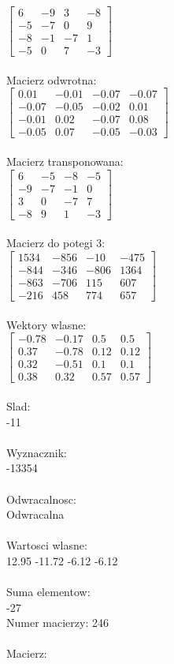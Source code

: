 \documentclass[a4paper,12pt]{article}
\begin{document}
$\begin{bmatrix} 6&-9&3&-8\\-5&-7&0&9\\-8&-1&-7&1\\-5&0&7&-3 \end{bmatrix}$
\\
\\
Macierz odwrotna:\\

$\begin{bmatrix} 0.01&-0.01&-0.07&-0.07\\-0.07&-0.05&-0.02&0.01\\-0.01&0.02&-0.07&0.08\\-0.05&0.07&-0.05&-0.03 \end{bmatrix}$
\\
\\
Macierz transponowana:\\

$\begin{bmatrix} 6&-5&-8&-5\\-9&-7&-1&0\\3&0&-7&7\\-8&9&1&-3 \end{bmatrix}$
\\
\\
Macierz do potegi 3:\\

$\begin{bmatrix} 1534&-856&-10&-475\\-844&-346&-806&1364\\-863&-706&115&607\\-216&458&774&657 \end{bmatrix}$
\\
\\
Wektory wlasne:\\

$\begin{bmatrix} -0.78&-0.17&0.5&0.5\\0.37&-0.78&0.12&0.12\\0.32&-0.51&0.1&0.1\\0.38&0.32&0.57&0.57 \end{bmatrix}$
\\
\\
Slad:\\
-11
\\
\\
Wyznacznik:\\
-13354
\\
\\
Odwracalnosc:\\
Odwracalna
\\
\\
Wartosci wlasne:\\
12.95 -11.72 -6.12 -6.12
\\
\\
Suma elementow:\\
-27
\\
\newpage
Numer macierzy:
246
\\
\\
Macierz:\\
\end{document}

